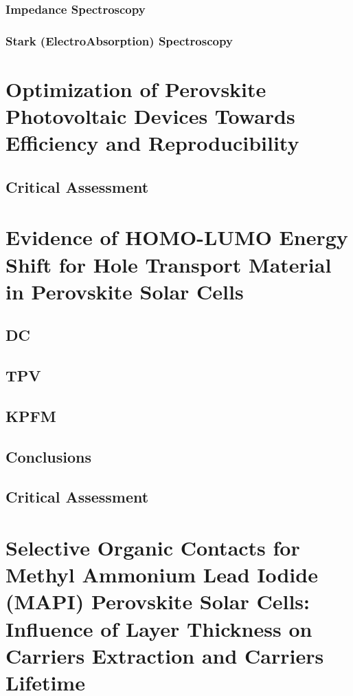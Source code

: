 \documentclass[a4paper, 12pt, openright]{book}
\begin{document}
		\subsection{Impedance Spectroscopy}
		
		\subsection{Stark (ElectroAbsorption) Spectroscopy}

\chapter{Optimization of Perovskite Photovoltaic Devices Towards Efficiency and Reproducibility}
	\section{Critical Assessment}

\chapter{Evidence of HOMO-LUMO Energy Shift for Hole Transport Material in Perovskite Solar Cells}
	\section{DC}
	\section{TPV}
	\section{KPFM}
	\section{Conclusions}
	\section{Critical Assessment}

\chapter{Selective Organic Contacts for Methyl Ammonium Lead Iodide (MAPI) Perovskite Solar Cells: Influence of Layer Thickness on Carriers Extraction and Carriers Lifetime}
\end{document}
